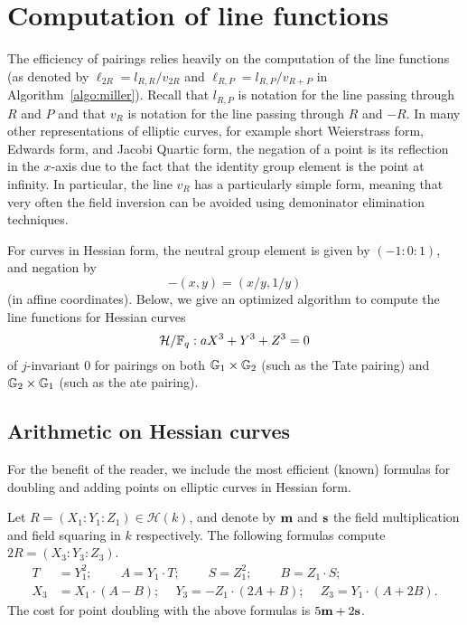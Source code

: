 \section{Computation of line functions}
\label{sec:lines}

The efficiency of pairings relies heavily on the computation of the line functions
(as denoted by $\ell_{2R} = l_{R,R}/v_{2R}$ and $\ell_{R,P} = l_{R,P}/v_{R+P}$ in Algorithm~\ref{algo:miller}).
Recall that $l_{R,P}$ is notation for the line passing through $R$ and $P$ and that
$v_{R}$ is notation for the line passing through $R$ and $-R$.
In many other representations of elliptic curves, for example short Weierstrass form,
Edwards form, and Jacobi Quartic form, the negation of a point is its reflection in the $x$-axis
due to the fact that the identity group element is the point at infinity.
In particular, the line $v_R$ has a particularly simple form, meaning that very often
the field inversion can be avoided using demoninator elimination techniques.

For curves in Hessian form, the neutral group element is given by $(-1:0:1)$,
and negation by
\[-(x,y) = (x/y,1/y)\]
(in affine coordinates).
Below, we give an optimized algorithm to compute the line functions for
Hessian curves 
\[\mathcal{H}/\mathbb{F}_{q}: aX^3 + Y^3 + Z^3 = 0\]
of $j$-invariant 0 
for pairings on both $\mathbb{G}_{1} \times \mathbb{G}_{2}$ (such as the Tate pairing)
and $\mathbb{G}_{2} \times \mathbb{G}_{1}$ (such as the ate pairing).

\subsection{Arithmetic on Hessian curves}

For the benefit of the reader, we include the most efficient (known) formulas
for doubling and adding points on elliptic curves in Hessian form.

Let $R = (X_1 : Y_1 : Z_1) \in \mathcal{H}(k)$, 
and denote by $\textbf{m}$ and $\textbf{s}$ 
the field multiplication and field squaring in $k$ respectively.
The following formulas compute $2R = (X_3 : Y_3 : Z_3)$.
\begin{align*}
T &= Y_1^2;\	\qquad	A = Y_1 \cdot T;\	\qquad
S = Z_1 ^ 2;\	\qquad	B = Z_1 \cdot S;\\
X_3 &= X_1 \cdot (A - B);\	\quad
Y_3 = -Z_1 \cdot (2A + B);\	\quad
Z_3 = Y_1 \cdot (A + 2B).
\end{align*}
The cost for point doubling with the above formulas is $5\textbf{m} + 2\textbf{s}$. 

